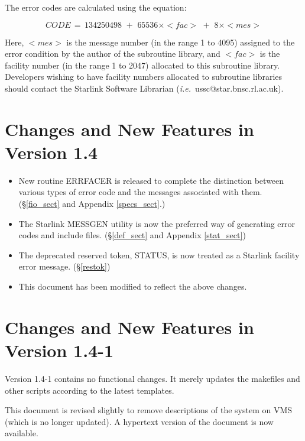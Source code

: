 \documentclass[twoside,11pt]{article}
\newcommand{\xlabel}[1]{}
\renewcommand{\_}{\texttt{\symbol{95}}}
\begin{document}
The error codes are calculated using the equation:

\begin {equation}
CODE \,= \, 134250498 \,\, + \,\, 65536\times <fac> \,\, + \,\,  8\times <mes> 
\end {equation}

Here, $<mes>$ is the message number (in the range 1 to 4095) assigned to the
error condition by the author of the subroutine library, and $<fac>$ is the
facility number (in the range 1 to 2047) allocated to this subroutine library.
Developers wishing to have facility numbers allocated to subroutine libraries 
should contact the Starlink Software Librarian 
(\textit{i.e.}\ ussc@star.bnsc.rl.ac.uk).

\section{\xlabel{changes_and_new_features_in_version_1_4}Changes and New Features in Version 1.4}
\begin{itemize}
\item New routine ERR\_FACER is released to complete the distinction between
various types of error code and the messages associated with them.
(\S\ref{fio_sect} and Appendix \ref{specs_sect}.)
\item The Starlink MESSGEN utility is now the preferred way of generating 
error codes and include files. (\S\ref{def_sect} and Appendix \ref{stat_sect})
\item The deprecated reserved token, STATUS, is now treated as a Starlink 
facility error message. (\S\ref{restok})
\item This document has been modified to reflect the above changes.
\end{itemize}

\section{\xlabel{changes_and_new_features_in_version_1_41}Changes and New Features in Version 1.4-1}
Version 1.4-1 contains no functional changes. It merely updates the makefiles
and other scripts according to the latest templates.

This document is revised slightly to remove descriptions of the system on VMS
(which is no longer updated). A hypertext version of the document is now
available.
\end{document}
